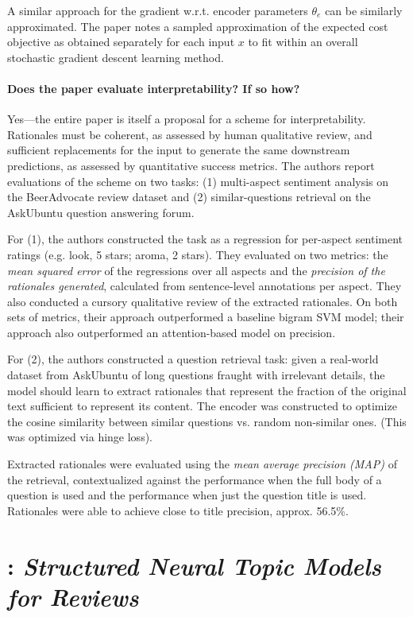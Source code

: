 \documentclass[11pt]{article}
\begin{document}
A similar approach for the gradient w.r.t. encoder parameters $\theta_e$ can be similarly approximated. The paper notes a sampled approximation of the expected cost objective as obtained separately for each input $x$ to fit within an overall stochastic gradient descent learning method.

\paragraph{Does the paper evaluate interpretability? If so how?} Yes---the entire paper is itself a proposal for a scheme for interpretability. Rationales must be coherent, as assessed by human qualitative review, and sufficient replacements for the input to generate the same downstream predictions, as assessed by quantitative success metrics. The authors report evaluations of the scheme on two tasks: (1) multi-aspect sentiment analysis on the BeerAdvocate review dataset and (2) similar-questions retrieval on the AskUbuntu question answering forum.

For (1), the authors constructed the task as a regression for per-aspect sentiment ratings (e.g. look, 5 stars; aroma, 2 stars). They evaluated on two metrics: the \textit{mean squared error} of the regressions over all aspects and the \textit{precision of the rationales generated}, calculated from sentence-level annotations per aspect. They also conducted a cursory qualitative review of the extracted rationales. On both sets of metrics, their approach outperformed a baseline bigram SVM model; their approach also outperformed an attention-based model on precision.

For (2), the authors constructed a question retrieval task: given a real-world dataset from AskUbuntu of long questions fraught with irrelevant details, the model should learn to extract rationales that represent the fraction of the original text sufficient to represent its content. The encoder was constructed to optimize the cosine similarity between similar questions vs. random non-similar ones. (This was optimized via hinge loss). 

Extracted rationales were evaluated using the \textit{mean average precision (MAP)} of the retrieval, contextualized against the performance when the full body of a question is used and the performance when just the question title is used. Rationales were able to achieve close to title precision, approx. 56.5\%.

\section{\cite{esmaeili2018structured}: \textit{Structured Neural Topic Models for Reviews}}
\end{document}
